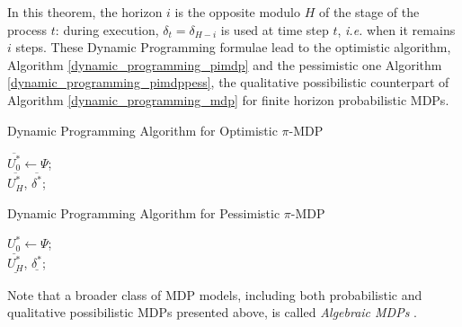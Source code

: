 In this theorem, the horizon $i$ is the opposite modulo $H$ 
of the stage of the process $t$: during execution,
$\delta_{t} = \delta_{H-i}$ is used at time step $t$,
\textit{i.e.} when it remains $i$ steps. 
These Dynamic Programming formulae 
lead to the optimistic algorithm, Algorithm \ref{dynamic_programming_pimdp} and 
the pessimistic one Algorithm \ref{dynamic_programming_pimdppess},
the qualitative possibilistic counterpart of Algorithm \ref{dynamic_programming_mdp}
for finite horizon probabilistic MDPs.
\begin{algorithm}
 \caption{Dynamic Programming Algorithm for Optimistic $\pi$-MDP} \label{dynamic_programming_pimdp}
$\overline{U^*_0} \gets \Psi$;\\
\Return $\overline{U^*_H}$, $\overline{\delta^*}$;
\end{algorithm}

\begin{algorithm}
 \caption{Dynamic Programming Algorithm for Pessimistic $\pi$-MDP} \label{dynamic_programming_pimdppess}
$\underline{U^*_0} \gets \Psi$;\\
\Return $\underline{U^*_H}$, $\underline{\delta^*}$;
\end{algorithm}

Note that a broader class of MDP models, 
including both probabilistic and qualitative possibilistic MDPs presented above,
is called \textit{Algebraic MDPs} \cite{LIP67955}. 


